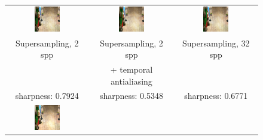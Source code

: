 \begin{figure}
\begin{tabular}{@{}c@{}c@{}@{}c@{}}
	 \includegraphics[width=0.33\textwidth]{figures/ss_2x_rect_370_300_300_300_frame_211.png} &
		 \includegraphics[width=0.33\textwidth]{figures/ss_2x_taa_rect_370_300_300_300_frame_211.png} &
		  \includegraphics[width=0.33\textwidth]{figures/ss_32x_rect_370_300_300_300_frame_211.png} \\	 
Supersampling, 2 spp & Supersampling, 2 spp 	& Supersampling, 32 spp \\
  					 & + temporal antialiasing 	&  \\
sharpness: 0.7924 & sharpness: 0.5348 & sharpness: 0.6771  \\
	 \includegraphics[width=0.33\textwidth]{figures/srt_1_rect_370_300_300_300_frame_211.png} &

\end{tabular}
\end{figure}
